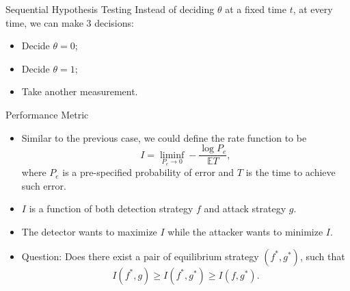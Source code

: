 \documentclass[10pt]{beamer}
\begin{document}
\begin{frame}{Sequential Hypothesis Testing}
  Instead of deciding $\theta$ at a fixed time $t$, at every time, we can make 3 decisions:
  \begin{itemize}
    \item Decide $\theta = 0$;
    \item Decide $\theta = 1$; 
    \item Take another measurement.
  \end{itemize}

\end{frame}

\begin{frame}{Performance Metric}
  \begin{itemize}
    \item Similar to the previous case, we could define the rate function to be
    \begin{displaymath}
      I = \liminf_{P_e\rightarrow 0} -\frac{\log P_e}{\mathbb E T},
    \end{displaymath}
    where $P_e$ is a pre-specified probability of error and $T$ is the time to achieve such error.
  \item  $I$ is a function of both detection strategy $f$ and attack strategy $g$.
  \item The detector wants to maximize $I$ while the attacker wants to minimize $I$.
  \item Question: Does there exist a pair of equilibrium strategy $(f^*,g^*)$, such that
    \begin{displaymath}
      I(f^*,g)\geq I(f^*,g^*) \geq I(f,g^*).	
    \end{displaymath}
  \end{itemize}  
\end{frame}
\end{document}
